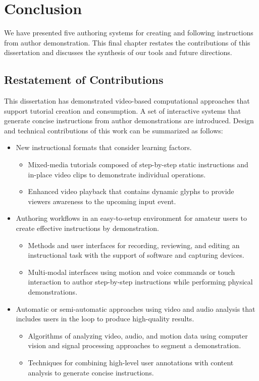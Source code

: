 \chapter{Conclusion}
\label{chapter_conclusion}

We have presented five authoring systems for creating and following instructions from author demonstration. This final chapter restates the contributions of this dissertation and discusses the synthesis of our tools and future directions.

\section{Restatement of Contributions}
This dissertation has demonstrated video-based computational approaches that support tutorial creation and consumption. A set of interactive systems that generate concise instructions from author demonstrations are introduced. Design and technical contributions of this work can be summarized as follows:

\begin{itemize}
  \item New instructional formats that consider learning factors.
    \begin{itemize}
      \item Mixed-media tutorials composed of step-by-step static instructions and in-place video clips to demonstrate individual operations.
      \item Enhanced video playback that contains dynamic glyphs to provide viewers awareness to the upcoming input event.
    \end{itemize}
  \item Authoring workflows in an easy-to-setup environment for amateur users to create effective instructions by demonstration.
    \begin{itemize}
      \item Methods and user interfaces for recording, reviewing, and editing an instructional task with the support of software and capturing devices.
      \item Multi-modal interfaces using motion and voice commands or touch interaction to author step-by-step instructions while performing physical demonstrations.
    \end{itemize}
  \item Automatic or semi-automatic approaches using video and audio analysis that includes users in the loop to produce high-quality results.
    \begin{itemize}
      \item Algorithms of analyzing video, audio, and motion data using computer vision and signal processing approaches to segment a demonstration.
      \item Techniques for combining high-level user annotations with content analysis to generate concise instructions.
    \end{itemize}
\end{itemize}

